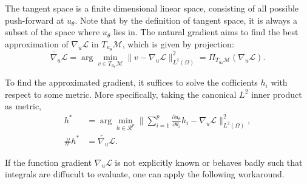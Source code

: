 \documentclass{article}
\begin{document}
The tangent space is a finite dimensional linear space, consisting of all possible push-forward at $u_\theta$. Note that by the definition of tangent space, 
it is always a subset of the space where $u_\theta$ lies in. The natural gradient aims to find the best approximation of $\nabla_u \mathcal{L}$ in $T_{u_\theta}\mathcal{M}$, which is given by projection:
\[
    \tilde{\nabla_u} \mathcal{L} = \arg\min_{v\in T_{u_\theta}\mathcal{M}}\|v- \nabla_u\mathcal{L}\|_{L^2(\Omega)}^2 = \Pi_{T_{u_\theta}\mathcal{M}}(\nabla_u\mathcal{L}). 
\]

To find the approximated gradient, it suffices to solve the cofficients $h_i$ with respect to some metric. More specifically, taking the canonical $L^2$ inner product as metric, 
\begin{align*}
    h^* &=  \arg\min_{h\in\mathcal{R}^p}\|\sum_{i=1}^p \frac{\partial u_\theta}{\partial \theta_i}h_i - \nabla_u\mathcal{L}\|_{L^2(\Omega)}^2, \\ 
    \#h^*&=\tilde{\nabla_u} \mathcal{L}.
\end{align*}

If the function gradient $\nabla_u \mathcal{L}$ is not explicitly known or behaves badly such that integrals are diffucult to evaluate, one can apply the following workaround. 
\end{document}
